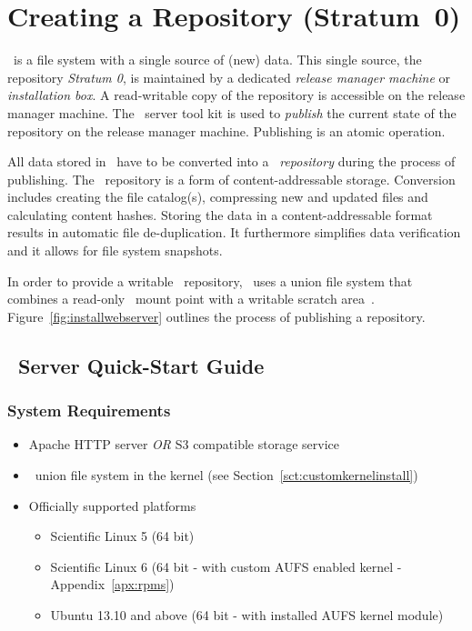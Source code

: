 \chapter{Creating a Repository (Stratum~0)}
\label{sct:createrepo}


\cvmfs\ is a file system with a single source of (new) data.
This single source, the repository \emph{Stratum 0}, is maintained by a dedicated \emph{release manager machine} or \emph{installation box}.
A read-writable copy of the repository is accessible on the release manager machine.
The \cvmfs\ server tool kit is used to \emph{publish} the current state of the repository on the release manager machine.
Publishing is an atomic operation.

All data stored in \cvmfs\ have to be converted into a \cvmfs\ \emph{repository} during the process of publishing.
The \cvmfs\ repository is a form of content-addressable storage.
Conversion includes creating the file catalog(s), compressing new and updated files and calculating content hashes.
Storing the data in a content-addressable format results in automatic file de-duplication.
It furthermore simplifies data verification and it allows for file system snapshots.

In order to provide a writable \cvmfs\ repository, \cvmfs\ uses a union file system that combines a read-only \cvmfs\ mount point with a writable scratch area~\cite{unionfs04,aufs}.
Figure~\ref{fig:installwebserver} outlines the process of publishing a repository.


\section{\cvmfs\ Server Quick-Start Guide}
\label{sct:quickstart}

\subsection{System Requirements}
\begin{itemize}
\item Apache HTTP server \emph{OR} S3 compatible storage service
\item \aufs\ union file system in the kernel (see Section~\ref{sct:customkernelinstall})
\item Officially supported platforms
\begin{itemize}
    \item Scientific Linux 5 (64 bit)
    \item Scientific Linux 6 (64 bit - with custom AUFS enabled kernel - Appendix~\ref{apx:rpms})
    \item Ubuntu 13.10 and above (64 bit - with installed AUFS kernel module)
\end{itemize}
\end{itemize}

